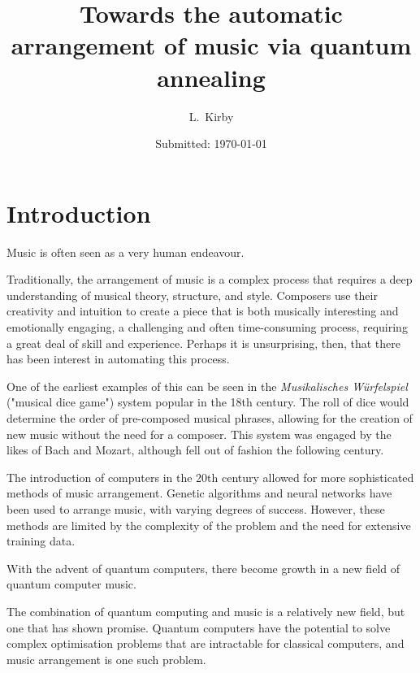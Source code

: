 \documentclass[aps,pra,10pt,twocolumn]{revtex4-2}
\begin{document}
\title{Towards the automatic arrangement of music via quantum annealing}
\author{L.\ Kirby}                              %
\date{Submitted: \today{}}     %

\begin{abstract}              

\lipsum[1]

\end{abstract}

\maketitle

\thispagestyle{plain} %

\section{Introduction} 

Music is often seen as a very human endeavour.

Traditionally, the arrangement of music is a complex process that requires a deep understanding of musical theory, structure, and style. Composers use their creativity and intuition to create a piece that is both musically interesting and emotionally engaging, a challenging and often time-consuming process, requiring a great deal of skill and experience. Perhaps it is unsurprising, then, that there has been interest in automating this process.

One of the earliest examples of this can be seen in the \textit{Musikalisches Würfelspiel} ("musical dice game") system popular in the 18th century. The roll of dice would determine the order of pre-composed musical phrases, allowing for the creation of new music without the need for a composer. This system was engaged by the likes of Bach and Mozart, although fell out of fashion the following century.

The introduction of computers in the 20th century allowed for more sophisticated methods of music arrangement. Genetic algorithms and neural networks have been used to arrange music, with varying degrees of success. However, these methods are limited by the complexity of the problem and the need for extensive training data.

With the advent of quantum computers, there become growth in a new field of quantum computer music.

The combination of quantum computing and music is a relatively new field, but one that has shown promise. Quantum computers have the potential to solve complex optimisation problems that are intractable for classical computers, and music arrangement is one such problem.
\end{document}
